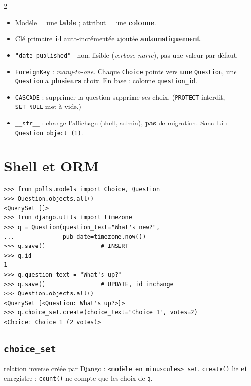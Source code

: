 \documentclass[a4paper,10pt]{article}
\newcommand{\co}[1]{\texttt{\textcolor{codefg}{#1}}}
\begin{document}
\begin{multicols}{2}
\begin{itemize}
  \item Modèle = une \textbf{table} ; attribut = une \textbf{colonne}.
  \item Clé primaire \co{id} auto-incrémentée ajoutée \textbf{automatiquement}.
  \item \co{"date published"} : nom lisible (\emph{verbose name}), pas une
        valeur par défaut.
  \item \co{ForeignKey} : \emph{many-to-one}. Chaque \co{Choice} pointe vers
        \textbf{une} \co{Question}, une \co{Question} a \textbf{plusieurs}
        choix. En base : colonne \co{question\_id}.
  \item \co{CASCADE} : supprimer la question supprime ses choix.
        (\co{PROTECT} interdit, \co{SET\_NULL} met à vide.)
  \item \co{\_\_str\_\_} : change l'affichage (shell, admin), \textbf{pas}
        de migration. Sans lui : \co{Question object (1)}.
\end{itemize}

\section{Shell et ORM}

\begin{lstlisting}
>>> from polls.models import Choice, Question
>>> Question.objects.all()
<QuerySet []>
>>> from django.utils import timezone
>>> q = Question(question_text="What's new?",
...              pub_date=timezone.now())
>>> q.save()                # INSERT
>>> q.id
1
>>> q.question_text = "What's up?"
>>> q.save()                # UPDATE, id inchange
>>> Question.objects.all()
<QuerySet [<Question: What's up?>]>
>>> q.choice_set.create(choice_text="Choice 1", votes=2)
<Choice: Choice 1 (2 votes)>
\end{lstlisting}

\subsection{\co{choice\_set}} relation inverse créée par Django :
\co{<modèle en minuscules>\_set}. \co{create()} lie \textbf{et}
enregistre ; \co{count()} ne compte que les choix de \co{q}.


\end{multicols}
\end{document}
